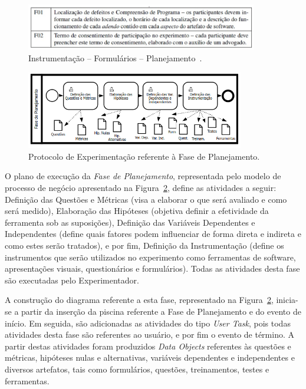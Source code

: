 \begin{figure}[!htb]
\centering
\includegraphics[width=0.9\textwidth]{images/tabela-instrumentacao5.png}
\caption{Instrumentação – Formulários – Planejamento~\cite{d2012avaliaccao}.}
\label{img:instrumentacao5}
\end{figure}

\begin{figure}[!htb]
\centering
\includegraphics[width=0.85\textwidth]{images/protocolo-planejamento.png}
\caption{Protocolo de Experimentação referente à Fase de Planejamento.}
\label{img:protocolo-planejamento}
\end{figure}


O plano de execução da \textit{Fase de Planejamento}, representada pelo modelo de processo de negócio apresentado na Figura~\ref{img:protocolo-planejamento}, define as atividades a seguir: Definição das Questões e Métricas (visa a elaborar o que será avaliado e como será medido), Elaboração das Hipóteses (objetiva definir a efetividade da ferramenta sob as suposições), Definição das Variáveis Dependentes e Independentes (define quais fatores podem influenciar de forma direta e indireta e como estes serão tratados), e por fim, Definição da Instrumentação (define os instrumentos que serão utilizados no experimento como ferramentas de software, apresentações visuais, questionários e formulários). Todas as atividades desta fase são executadas pelo Experimentador.

A construção do diagrama referente a esta fase, representado na Figura~\ref{img:protocolo-planejamento}, inicia-se a partir da inserção da piscina referente a Fase de Planejamento e do evento de início. Em seguida, são adicionadas as atividades do tipo \textit{User Task}, pois todas atividades desta fase são referentes ao usuário, e por fim o evento de término. A partir destas atividades foram produzidos \textit{Data Objects} referentes às questões e métricas, hipóteses nulas e alternativas, variáveis dependentes e independentes e diversos artefatos, tais como formulários, questões, treinamentos, testes e ferramentas.

